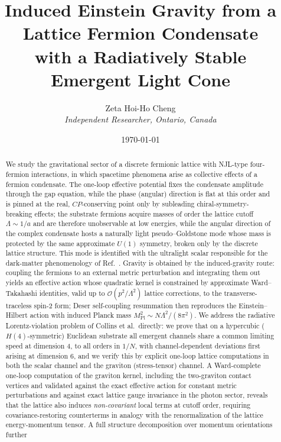 \documentclass[11pt,a4paper]{article}
\title{\textbf{Induced Einstein Gravity from a Lattice Fermion
Condensate \\ with a Radiatively Stable Emergent Light Cone}}
\author{Zeta Hoi-Ho Cheng \\
\textit{Independent Researcher, Ontario, Canada}}
\date{\today}
\begin{document}
\maketitle

\begin{abstract}
We study the gravitational sector of a discrete fermionic lattice
with NJL-type four-fermion interactions, in which spacetime
phenomena arise as collective effects of a fermion condensate.
The one-loop effective potential fixes the condensate amplitude
through the gap equation, while the phase (angular) direction is
flat at this order and is pinned at the real, $CP$-conserving point
only by subleading chiral-symmetry-breaking effects; the substrate
fermions acquire masses of order the lattice cutoff
$\Lambda \sim 1/a$ and are therefore unobservable at low energies,
while the angular direction of the complex condensate hosts a
naturally light pseudo--Goldstone mode whose mass is protected by
the same approximate $U(1)$ symmetry, broken only by the discrete
lattice structure.
This mode is identified with the ultralight scalar responsible for
the dark-matter phenomenology of Ref.~\cite{Cheng:2025sparc}.
Gravity is obtained by the induced-gravity route: coupling the
fermions to an external metric perturbation and integrating them
out yields an effective action whose quadratic kernel is
constrained by approximate Ward--Takahashi identities, valid up to
$\mathcal{O}(p^2/\Lambda^2)$ lattice corrections, to the
transverse-traceless spin-2 form; Deser self-coupling resummation
then reproduces the Einstein--Hilbert action with induced Planck
mass $M_{\mathrm{Pl}}^2 \sim N\Lambda^2/(8\pi^2)$.
We address the radiative Lorentz-violation problem of Collins
et al.\ directly: we prove that on a hypercubic ($H(4)$-symmetric)
Euclidean substrate all emergent channels share a common limiting
speed at dimension 4, to all orders in $1/N$, with
channel-dependent deviations first arising at dimension 6, and we
verify this by explicit one-loop lattice computations in both the
scalar channel and the graviton (stress-tensor) channel.
A Ward-complete one-loop computation of the graviton kernel,
including the two-graviton contact vertices and validated against
the exact effective action for constant metric perturbations and
against exact lattice gauge invariance in the photon sector,
reveals that the lattice also induces \emph{non-covariant} local
terms at cutoff order, requiring covariance-restoring counterterms
in analogy with the renormalization of the lattice energy-momentum
tensor.
A full structure decomposition over momentum orientations further

\end{abstract}
\end{document}
